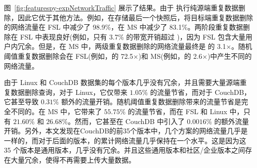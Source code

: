 图~\ref{fig:featurespy-expNetworkTraffic} 展示了结果。由于 \prototype 执行纯源端重复数据删除，因此它优于其他方法。例如，在存储最后一个快照后，\prototype 将目标端重复数据删除的网络流量在 FSL 中减少了 98.9\%，在 MS 中减少了 83.1\%。两阶段重复数据删除在 ​​FSL 中表现良好(例如，只有 3.7\% 的带宽开销超过 \prototype)，因为 FSL 包含大量用户内冗余。但是，在 MS 中，两级重复数据删除的网络流量最终是 \prototype 的 3.1$\times$。随机阈值重复数据删除会在 FSL(例如，\prototype 的 72.5$\times$)和 MS(例如，\prototype 的 2.6$\times$)中产生不同的网络流量。

由于 Linux 和 CouchDB 数据集的每个版本几乎没有冗余，并且需要大量源端重复数据删除查询，对于 Linux，它仅带来 $1.05\%$ 的流量节省，而对于 CouchDB，它甚至导致 $0.31 \%$ 额外的流量开销。随机阈值重复数据删除带来的流量节省是完全不同的。在 MS 中，它带来了 $55.75\%$ 的流量节省，而在 FSL 和 Linux 中，只有 $21.60\%$ 和 $26.68\%$。然而，它甚至在 CouchDB 中引入了 $0.0016\%$ 的额外流量开销。另外，本文发现在CouchDB的前35个版本中，几个方案的网络流量几乎是一样的，而对于后面的版本，\prototype 的累计网络流量几乎保持在一个水平。这是因为这 35 个版本是通用版本，几乎没有冗余。并且这些通用版本和社区/企业版本之间存在大量冗余，使得\prototype 不再需要上传大量数据。